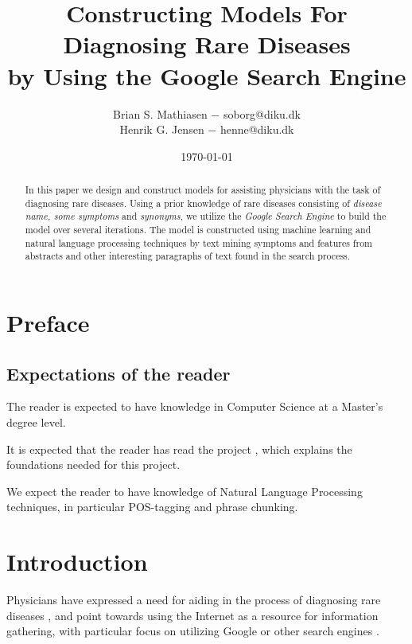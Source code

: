 \documentclass[10pt,letterpaper,final]{article}
\title{Constructing Models For Diagnosing Rare Diseases\\
        \small{by Using the Google Search Engine}}
\author{Brian S. Mathiasen $-$ soborg@diku.dk \\
        Henrik G. Jensen $-$ henne@diku.dk\\
}
\date{\today} %
\begin{document}
\maketitle
\listoffixmes


\begin{abstract}
In this paper we design and construct models for assisting physicians
with the task of diagnosing rare diseases. Using a prior knowledge of
rare diseases consisting of \textit{disease name, some symptoms} and
\textit{synonyms}, we utilize the \textit{Google Search Engine} to build
the model over several iterations. The model is constructed using
machine learning and natural language processing techniques by text
mining symptoms and features from abstracts and other interesting
paragraphs of text found in the search process.

\end{abstract}

\section{Preface}
\subsection{Expectations of the reader}
The reader is expected to have knowledge in Computer Science at a
Master's degree level.

It is expected that the reader has read the project
\cite{jensenandersen}, which explains the foundations needed for this
project.

We expect the reader to have knowledge of Natural Language Processing
techniques, in particular POS-tagging and phrase chunking.


\section{Introduction}
\label{chap:introduction}
Physicians have expressed a need for aiding in the process of diagnosing
rare diseases \cite{googlingdiagnosis}, and point towards using the
Internet as a resource for information gathering, with particular focus
on utilizing Google or other search engines \cite{googlechangemedicine}
\cite{diagnosissearchengines}.

\end{document}
